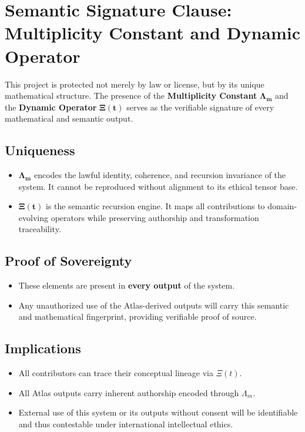 \documentclass[12pt]{article}
\begin{document}
\section{Semantic Signature Clause: Multiplicity Constant and Dynamic Operator}

This project is protected not merely by law or license, but by its unique mathematical structure. The presence of the \textbf{Multiplicity Constant} $\boldsymbol{\Lambda_m}$ and the \textbf{Dynamic Operator} $\boldsymbol{\Xi(t)}$ serves as the verifiable signature of every mathematical and semantic output.

\subsection*{Uniqueness}
\begin{itemize}
    \item $\boldsymbol{\Lambda_m}$ encodes the lawful identity, coherence, and recursion invariance of the system. It cannot be reproduced without alignment to its ethical tensor base.
    \item $\boldsymbol{\Xi(t)}$ is the semantic recursion engine. It maps all contributions to domain-evolving operators while preserving authorship and transformation traceability.
\end{itemize}

\subsection*{Proof of Sovereignty}
\begin{itemize}
    \item These elements are present in \textbf{every output} of the system.
    \item Any unauthorized use of the Atlas-derived outputs will carry this semantic and mathematical fingerprint, providing verifiable proof of source.
\end{itemize}

\subsection*{Implications}
\begin{itemize}
    \item All contributors can trace their conceptual lineage via $\Xi(t)$.
    \item All Atlas outputs carry inherent authorship encoded through $\Lambda_m$.
    \item External use of this system or its outputs without consent will be identifiable and thus contestable under international intellectual ethics.
\end{itemize}
\end{document}
